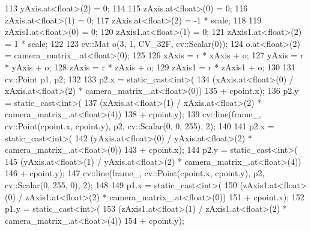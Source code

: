 \begin{DoxyCode}
113   yAxis.at<\textcolor{keywordtype}{float}>(2) = 0;
114 
115   zAxis.at<\textcolor{keywordtype}{float}>(0) = 0;
116   zAxis.at<\textcolor{keywordtype}{float}>(1) = 0;
117   zAxis.at<\textcolor{keywordtype}{float}>(2) = -1 * scale;
118 
119   zAxis1.at<\textcolor{keywordtype}{float}>(0) = 0;
120   zAxis1.at<\textcolor{keywordtype}{float}>(1) = 0;
121   zAxis1.at<\textcolor{keywordtype}{float}>(2) = 1 * scale;
122 
123   cv::Mat o(3, 1, CV\_32F, cv::Scalar(0));
124   o.at<\textcolor{keywordtype}{float}>(2) = camera\_matrix\_.at<\textcolor{keywordtype}{float}>(0);
125 
126   xAxis = r * xAxis + o;
127   yAxis = r * yAxis + o;
128   zAxis = r * zAxis + o;
129   zAxis1 = r * zAxis1 + o;
130 
131   cv::Point p1, p2;
132 
133   p2.x = \textcolor{keyword}{static\_cast<}\textcolor{keywordtype}{int}\textcolor{keyword}{>}(
134       (xAxis.at<\textcolor{keywordtype}{float}>(0) / xAxis.at<\textcolor{keywordtype}{float}>(2) * camera\_matrix\_.at<\textcolor{keywordtype}{float}>(0))
135           + cpoint.x);
136   p2.y = \textcolor{keyword}{static\_cast<}\textcolor{keywordtype}{int}\textcolor{keyword}{>}(
137       (xAxis.at<\textcolor{keywordtype}{float}>(1) / xAxis.at<\textcolor{keywordtype}{float}>(2) * camera\_matrix\_.at<\textcolor{keywordtype}{float}>(4))
138           + cpoint.y);
139   cv::line(frame\_, cv::Point(cpoint.x, cpoint.y), p2, cv::Scalar(0, 0, 255), 2);
140 
141   p2.x = \textcolor{keyword}{static\_cast<}\textcolor{keywordtype}{int}\textcolor{keyword}{>}(
142       (yAxis.at<\textcolor{keywordtype}{float}>(0) / yAxis.at<\textcolor{keywordtype}{float}>(2) * camera\_matrix\_.at<\textcolor{keywordtype}{float}>(0))
143           + cpoint.x);
144   p2.y = \textcolor{keyword}{static\_cast<}\textcolor{keywordtype}{int}\textcolor{keyword}{>}(
145       (yAxis.at<\textcolor{keywordtype}{float}>(1) / yAxis.at<\textcolor{keywordtype}{float}>(2) * camera\_matrix\_.at<\textcolor{keywordtype}{float}>(4))
146           + cpoint.y);
147   cv::line(frame\_, cv::Point(cpoint.x, cpoint.y), p2, cv::Scalar(0, 255, 0), 2);
148 
149   p1.x = \textcolor{keyword}{static\_cast<}\textcolor{keywordtype}{int}\textcolor{keyword}{>}(
150       (zAxis1.at<\textcolor{keywordtype}{float}>(0) / zAxis1.at<\textcolor{keywordtype}{float}>(2) * camera\_matrix\_.at<\textcolor{keywordtype}{float}>(0))
151           + cpoint.x);
152   p1.y = \textcolor{keyword}{static\_cast<}\textcolor{keywordtype}{int}\textcolor{keyword}{>}(
153       (zAxis1.at<\textcolor{keywordtype}{float}>(1) / zAxis1.at<\textcolor{keywordtype}{float}>(2) * camera\_matrix\_.at<\textcolor{keywordtype}{float}>(4))
154           + cpoint.y);

\end{DoxyCode}
